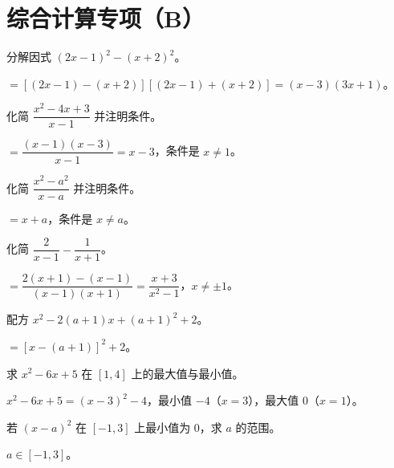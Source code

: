 \section{综合计算专项（B）}

\begin{problem}
分解因式 $(2x-1)^2-(x+2)^2$。
\end{problem}
\begin{solution}
$=[(2x-1)-(x+2)][(2x-1)+(x+2)]=(x-3)(3x+1)$。
\end{solution}

\begin{problem}
化简 $\dfrac{x^2-4x+3}{x-1}$ 并注明条件。
\end{problem}
\begin{solution}
$=\dfrac{(x-1)(x-3)}{x-1}=x-3$，条件是 $x\ne1$。
\end{solution}

\begin{problem}
化简 $\dfrac{x^2-a^2}{x-a}$ 并注明条件。
\end{problem}
\begin{solution}
$=x+a$，条件是 $x\ne a$。
\end{solution}

\begin{problem}
化简 $\dfrac{2}{x-1}-\dfrac{1}{x+1}$。
\end{problem}
\begin{solution}
$=\dfrac{2(x+1)-(x-1)}{(x-1)(x+1)}=\dfrac{x+3}{x^2-1}$，$x\ne\pm1$。
\end{solution}

\begin{problem}
配方 $x^2-2(a+1)x+(a+1)^2+2$。
\end{problem}
\begin{solution}
$=[x-(a+1)]^2+2$。
\end{solution}

\begin{problem}
求 $x^2-6x+5$ 在 $[1,4]$ 上的最大值与最小值。
\end{problem}
\begin{solution}
$x^2-6x+5=(x-3)^2-4$，最小值 $-4$（$x=3$），最大值 $0$（$x=1$）。
\end{solution}

\begin{problem}
若 $(x-a)^2$ 在 $[-1,3]$ 上最小值为 $0$，求 $a$ 的范围。
\end{problem}
\begin{solution}
$a\in[-1,3]$。
\end{solution}

